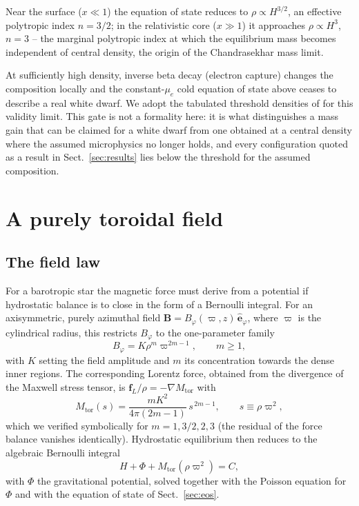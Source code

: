 \documentclass{aa}
\begin{document}
Near the surface ($x \ll 1$) the equation of state reduces to
$\rho \propto H^{3/2}$, an effective polytropic index $n=3/2$; in the
relativistic core ($x \gg 1$) it approaches $\rho \propto H^3$,
$n=3$ -- the marginal polytropic index at which the equilibrium mass
becomes independent of central density, the origin of the
Chandrasekhar mass limit.

At sufficiently high density, inverse beta decay (electron capture)
changes the composition locally and the constant-$\mu_e$ cold equation
of state above ceases to describe a real white dwarf. We adopt the
tabulated threshold densities of \citet{boshkayev2013} for this
validity limit. This gate is not a formality here: it is what
distinguishes a mass gain that can be claimed for a white dwarf from
one obtained at a central density where the assumed microphysics no
longer holds, and every configuration quoted as a result in
Sect.~\ref{sec:results} lies below the threshold for the assumed
composition.


\section{A purely toroidal field}
\label{sec:toroidal}

\subsection{The field law}

For a barotropic star the magnetic force must derive from a potential
if hydrostatic balance is to close in the form of a Bernoulli integral.
For an axisymmetric, purely azimuthal field
$\mathbf{B} = B_\varphi(\varpi,z)\,\hat{\mathbf{e}}_\varphi$, where
$\varpi$ is the cylindrical radius, this restricts $B_\varphi$ to the
one-parameter family
\begin{equation}
B_\varphi = K \rho^m \varpi^{2m-1}, \qquad m \ge 1,
\label{eq:fieldlaw}
\end{equation}
with $K$ setting the field amplitude and $m$ its concentration towards
the dense inner regions. The corresponding Lorentz force, obtained from
the divergence of the Maxwell stress tensor, is
$\mathbf{f}_L/\rho = -\nabla M_{\mathrm{tor}}$ with
\begin{equation}
M_{\mathrm{tor}}(s) = \frac{m K^2}{4\pi(2m-1)}\, s^{\,2m-1},
\qquad s \equiv \rho\varpi^2 ,
\label{eq:mtor}
\end{equation}
which we verified symbolically for $m = 1, 3/2, 2, 3$ (the residual of
the force balance vanishes identically). Hydrostatic equilibrium then
reduces to the algebraic Bernoulli integral
\begin{equation}
H + \Phi + M_{\mathrm{tor}}(\rho\varpi^2) = C ,
\label{eq:bernoulli}
\end{equation}
with $\Phi$ the gravitational potential, solved together with the
Poisson equation for $\Phi$ and with the equation of state of
Sect.~\ref{sec:eos}.
\end{document}
